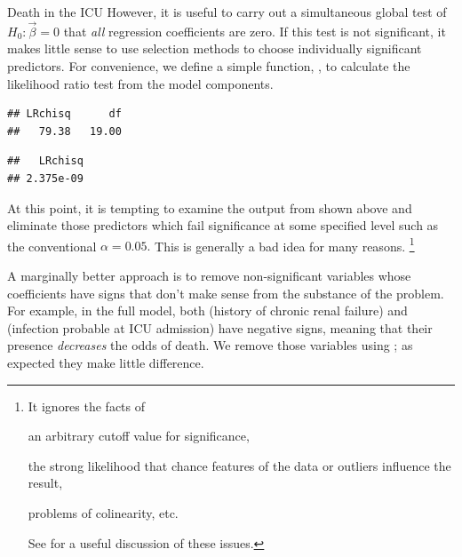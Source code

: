 \documentclass[11pt]{book}
\renewenvironment{knitrout}{\small\renewcommand{\baselinestretch}{.85}}{} %
\begin{document}
\begin{Example}[icu1]{Death in the ICU}
However, it is useful to carry out a simultaneous
global test of $H_0 : \vec{\beta}=0$ that \emph{all} regression coefficients
are zero.  If this test is not significant, it makes little sense to use
selection methods to choose individually significant predictors.
For convenience, we define a
simple function, , to calculate the likelihood ratio test
from the model components.
\begin{knitrout}
\color{fgcolor}\begin{kframe}
\begin{alltt}
 \hlkwb{<-} \hlstd{(}\hlstd{)}
  \hlstd{(}\hlopt{$} \hlopt{-} \hlopt{$}
    \hlopt{$} \hlopt{-} \hlopt{$}

 \hlkwb{<-} 
\end{alltt}
\begin{verbatim}
## LRchisq      df 
##   79.38   19.00
\end{verbatim}
\begin{alltt}
\hlkwb{=}\hlopt{-}\hlstd{(LR[}\hlstd{],LR[}\hlstd{]))}
\end{alltt}
\begin{verbatim}
##   LRchisq 
## 2.375e-09
\end{verbatim}
\end{kframe}
\end{knitrout}

At this point, it is tempting to examine the output from 
shown above and eliminate those predictors which fail significance at some
specified level such as the conventional $\alpha=0.05.$
This is generally a bad idea for many reasons.%
\footnote{
It ignores the facts of 
\begin{seriate}
\item an arbitrary cutoff value for significance,
\item the strong likelihood that chance features of the data or outliers influence the result,
\item problems of colinearity, etc.  
\end{seriate}
See \citet[\S 4.3]{Harrell:2001} for a useful discussion
of these issues.
}

A marginally better approach is to remove non-significant variables 
whose coefficients have signs that don't make sense
from the substance of the problem.
For example,
in the full model, both  (history of chronic renal failure)
and  (infection probable at ICU admission)
have negative signs, meaning that their presence \emph{decreases} the odds of
death.  We remove those variables using ;  as expected they make
little difference.


\end{Example}
\end{document}
